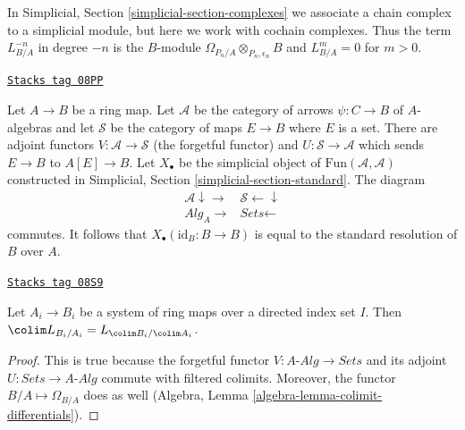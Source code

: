 In Simplicial, Section \ref{simplicial-section-complexes} we associate a
chain complex to a simplicial module, but here we work with cochain complexes.
Thus the term $L_{B/A}^{-n}$ in degree $-n$ is the $B$-module
$\Omega_{P_n/A} \otimes_{P_n, \epsilon_n} B$ and $L_{B/A}^m = 0$
for $m > 0$.

\begin{remark}
\label{cotangent-remark-variant-cotangent-complex}
\href{https://stacks.math.columbia.edu/tag/08PP}{\texttt{Stacks tag 08PP}}

Let $A \to B$ be a ring map. Let $\mathcal{A}$ be the category of
arrows $\psi : C \to B$ of $A$-algebras and let $\mathcal{S}$ be
the category of maps $E \to B$ where $E$ is a set. There are adjoint
functors $V : \mathcal{A} \to \mathcal{S}$ (the forgetful functor)
and $U : \mathcal{S} \to \mathcal{A}$ which sends $E \to B$ to
$A[E] \to B$. Let $X_\bullet$ be the simplicial object of
$\text{Fun}(\mathcal{A}, \mathcal{A})$ constructed in
Simplicial, Section \ref{simplicial-section-standard}.
The diagram
$$
\begin{array}{cc}\mathcal{A} \downarrow\longrightarrow & \mathcal{S} \longleftarrow\downarrow \\ \textit{Alg}_A \longrightarrow & \textit{Sets} \longleftarrow\end{array}
$$
commutes. It follows that $X_\bullet(\text{id}_B : B \to B)$
is equal to the standard resolution of $B$ over $A$.
\end{remark}

\begin{lemma}
\label{cotangent-lemma-colimit-cotangent-complex}
\href{https://stacks.math.columbia.edu/tag/08S9}{\texttt{Stacks tag 08S9}}

Let $A_i \to B_i$ be a system of ring maps over a directed index
set $I$. Then $\colim L_{B_i/A_i} = L_{\colim B_i/\colim A_i}$.
\end{lemma}

\begin{proof}
This is true because the forgetful functor
$V : A\textit{-Alg} \to \textit{Sets}$ and its adjoint
$U : \textit{Sets} \to A\textit{-Alg}$ commute with filtered colimits.
Moreover, the functor $B/A \mapsto \Omega_{B/A}$ does as well
(Algebra, Lemma \ref{algebra-lemma-colimit-differentials}).
\end{proof}

